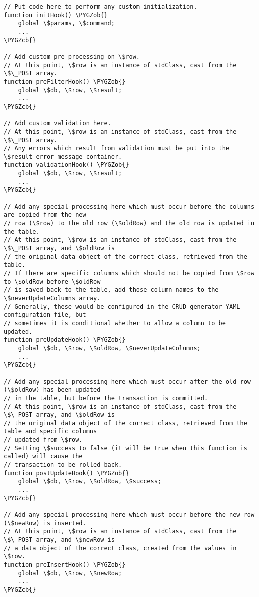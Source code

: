 \documentclass[letterpaper,10pt,english]{sphinxmanual}
\def\PYGZob{\char`\{}
\def\PYGZcb{\char`\}}
\begin{document}
\begin{Verbatim}[commandchars=\\\{\}]
// Put code here to perform any custom initialization.
function initHook() \PYGZob{}
    global \$params, \$command;
    ...
\PYGZcb{}

// Add custom pre-processing on \$row.
// At this point, \$row is an instance of stdClass, cast from the \$\_POST array.
function preFilterHook() \PYGZob{}
    global \$db, \$row, \$result;
    ...
\PYGZcb{}

// Add custom validation here.
// At this point, \$row is an instance of stdClass, cast from the \$\_POST array.
// Any errors which result from validation must be put into the \$result error message container.
function validationHook() \PYGZob{}
    global \$db, \$row, \$result;
    ...
\PYGZcb{}

// Add any special processing here which must occur before the columns are copied from the new
// row (\$row) to the old row (\$oldRow) and the old row is updated in the table.
// At this point, \$row is an instance of stdClass, cast from the \$\_POST array, and \$oldRow is
// the original data object of the correct class, retrieved from the table.
// If there are specific columns which should not be copied from \$row to \$oldRow before \$oldRow
// is saved back to the table, add those column names to the \$neverUpdateColumns array.
// Generally, these would be configured in the CRUD generator YAML configuration file, but
// sometimes it is conditional whether to allow a column to be updated.
function preUpdateHook() \PYGZob{}
    global \$db, \$row, \$oldRow, \$neverUpdateColumns;
    ...
\PYGZcb{}

// Add any special processing here which must occur after the old row (\$oldRow) has been updated
// in the table, but before the transaction is committed.
// At this point, \$row is an instance of stdClass, cast from the \$\_POST array, and \$oldRow is
// the original data object of the correct class, retrieved from the table and specific columns
// updated from \$row.
// Setting \$success to false (it will be true when this function is called) will cause the
// transaction to be rolled back.
function postUpdateHook() \PYGZob{}
    global \$db, \$row, \$oldRow, \$success;
    ...
\PYGZcb{}

// Add any special processing here which must occur before the new row (\$newRow) is inserted.
// At this point, \$row is an instance of stdClass, cast from the \$\_POST array, and \$newRow is
// a data object of the correct class, created from the values in \$row.
function preInsertHook() \PYGZob{}
    global \$db, \$row, \$newRow;
    ...
\PYGZcb{}


\end{Verbatim}
\end{document}
